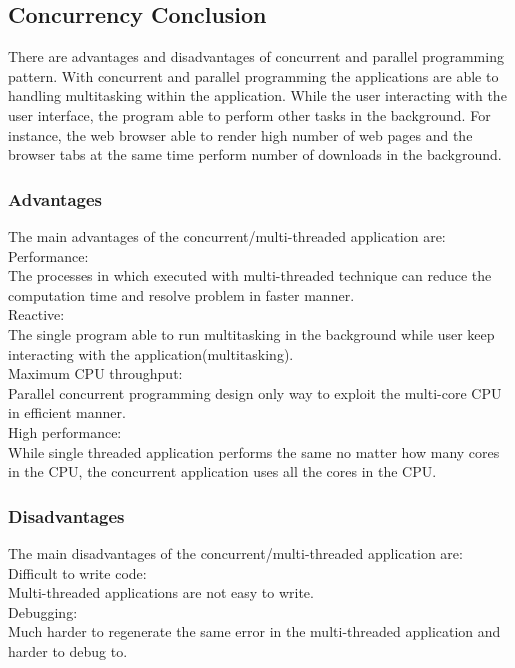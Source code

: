 \documentclass[12pt]{article}
\begin{document}
\subsection{Concurrency Conclusion}
There are advantages and disadvantages of concurrent and parallel programming pattern. With concurrent and parallel programming the applications are able to handling multitasking within the application. While the user interacting with the user interface, the program able to perform other tasks in the background. For instance, the web browser able to render high number of web pages and the browser tabs at the same time perform number of downloads in the background.  

	\subsubsection{Advantages}
{\setlength{\parindent}{0cm}
The main advantages of the concurrent/multi-threaded application are:\\

Performance:\\
The processes in which executed with multi-threaded technique can reduce the computation time and resolve problem in faster manner.\\

Reactive:\\
The single program able to run multitasking in the background while user keep interacting with the application(multitasking).\\

Maximum CPU throughput:\\
Parallel concurrent programming design only way to exploit the multi-core CPU in efficient manner. \\

High performance:\\
While single threaded application performs the same no matter how many cores in the CPU, the concurrent application uses all the cores in the CPU.}
	\subsubsection{Disadvantages}
{\setlength{\parindent}{0cm}
The main disadvantages of the concurrent/multi-threaded application are:\\

Difficult to write code:\\
Multi-threaded applications are not easy to write.\\

Debugging:\\
Much harder to regenerate the same error in the multi-threaded application and harder to debug to.}
\end{document}
